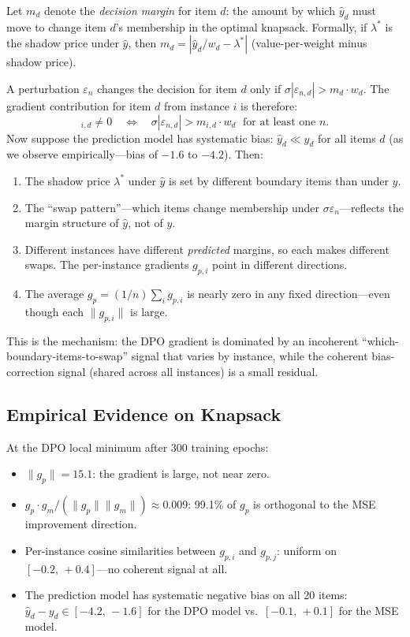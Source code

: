 \documentclass[11pt]{article}
\begin{document}
Let $m_d$ denote the \emph{decision margin} for item $d$: the amount by which
$\hat{y}_d$ must move to change item $d$'s membership in the optimal knapsack.
Formally, if $\lambda^*$ is the shadow price under $\hat{y}$, then
$m_d = |\hat{y}_d / w_d - \lambda^*|$ (value-per-weight minus shadow price).

A perturbation $\varepsilon_n$ changes the decision for item $d$ only if
$\sigma|\varepsilon_{n,d}| > m_d \cdot w_d$.  The gradient contribution for
item $d$ from instance $i$ is therefore:
\begin{equation}
  [g_p]_{i,d} \neq 0 \quad\Longleftrightarrow\quad
  \sigma|\varepsilon_{n,d}| > m_{i,d} \cdot w_d
  \;\text{ for at least one } n.
\end{equation}
Now suppose the prediction model has systematic bias: $\hat{y}_d \ll y_d$ for all
items $d$ (as we observe empirically---bias of $-1.6$ to $-4.2$).  Then:
\begin{enumerate}[itemsep=2pt]
  \item The shadow price $\lambda^*$ under $\hat{y}$ is set by different boundary
        items than under $y$.
  \item The ``swap pattern''---which items change membership under
        $\sigma\varepsilon_n$---reflects the margin structure of $\hat{y}$,
        not of $y$.
  \item Different instances have different \emph{predicted} margins, so each
        makes different swaps.  The per-instance gradients $g_{p,i}$ point in
        different directions.
  \item The average $g_p = (1/n)\sum_i g_{p,i}$ is nearly zero in any fixed
        direction---even though each $\|g_{p,i}\|$ is large.
\end{enumerate}
This is the mechanism: the DPO gradient is dominated by an incoherent
``which-boundary-items-to-swap'' signal that varies by instance, while the
coherent bias-correction signal (shared across all instances) is a small residual.

\subsection{Empirical Evidence on Knapsack}

At the DPO local minimum after 300 training epochs:
\begin{itemize}[itemsep=2pt]
  \item $\|g_p\| = 15.1$: the gradient is large, not near zero.
  \item $g_p \cdot g_m / (\|g_p\|\|g_m\|) \approx 0.009$: 99.1\% of $g_p$ is
        orthogonal to the MSE improvement direction.
  \item Per-instance cosine similarities between $g_{p,i}$ and $g_{p,j}$:
        uniform on $[-0.2,\, +0.4]$---no coherent signal at all.
  \item The prediction model has systematic negative bias on all 20 items:
        $\hat{y}_d - y_d \in [-4.2,\, -1.6]$ for the DPO model vs.\
        $[-0.1,\, +0.1]$ for the MSE model.
\end{itemize}
\end{document}
